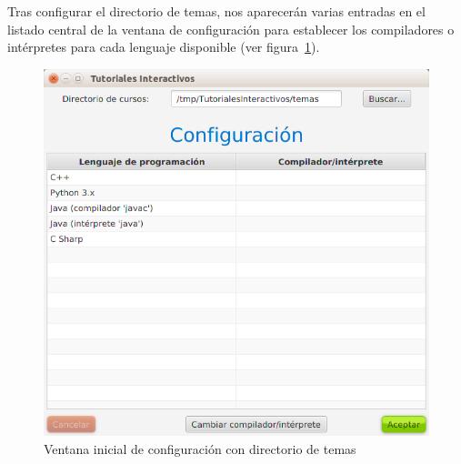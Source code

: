\documentclass[]{article}
\begin{document}
Tras configurar el directorio de temas, nos aparecerán varias entradas en el listado central de la ventana de configuración para establecer los compiladores o intérpretes para cada lenguaje disponible (ver figura~\ref{fig:config2}).
%
\begin{figure}[tbp]
	\begin{center}
		\includegraphics[scale=0.4]{Configuracion_lenguajes_vacio.png}
	\end{center}
	\caption{Ventana inicial de configuración con directorio de temas\label{fig:config2}}
\end{figure}
%
\end{document}
